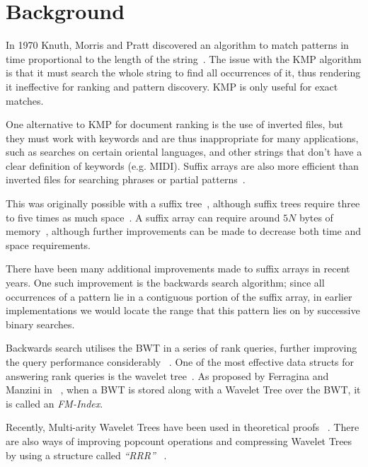 \section{Background}
In 1970 Knuth, Morris and Pratt discovered an algorithm to match patterns in
time proportional to the length of the string~\cite{KMP77, McCreight76}. The
issue with the KMP algorithm is that it must search the whole string to find all
occurrences of it, thus rendering it ineffective for ranking and pattern
discovery. KMP is only useful for
exact matches.

One alternative to KMP for document ranking is the use of inverted files, but
they must work with keywords and are thus inappropriate for many applications,
such as searches on certain oriental languages, and other strings that don't
have a clear definition of keywords (e.g. MIDI). Suffix arrays are also more
efficient than inverted files for searching phrases or partial
patterns~\cite{MN10}.

This was originally
possible with a suffix tree~\cite{McCreight76}, although suffix trees require
three to five times as much space~\cite{manber1990}. A suffix array can require
around $5N$ bytes of memory~\cite{manber1990}, although further improvements can
be made to decrease both time and space requirements.

There have been many additional improvements made to suffix arrays
in recent years. One such improvement is the backwards search algorithm;
since all occurrences of a pattern lie in a contiguous portion of the suffix
array, in earlier implementations we would locate the range that this pattern
lies on by successive binary searches. 

Backwards search utilises the BWT in a series of rank queries, further
improving the query performance considerably ~\cite{CN08, FGM09, FMMN07, GMR06,
MN07:rankselect, MN07:selfindex, MN10, MN06}. One of the most effective data
structs for answering rank queries is the wavelet tree~\cite{CN08, FGM09,
FMMN07, GGV03, MN07:selfindex}. As proposed by Ferragina and Manzini in
~\cite{fmindex:ferragina2000}, when a BWT is stored along with a Wavelet Tree
over the BWT, it is called an \emph{FM-Index}.

Recently, Multi-arity Wavelet Trees have been used in theoretical proofs
~\cite{FMMN07, yu2009}. There are also ways of improving popcount operations and
compressing Wavelet Trees by using a structure called \emph{``RRR''}
~\cite{rrr2007}.
